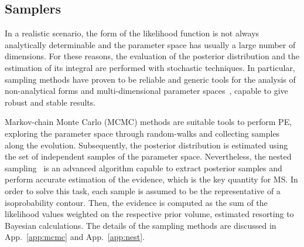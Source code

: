 \documentclass[prd,aps,twocolumn,a4paper,showkeys,nofootinbib,floatfix]{revtex4-1}
\newcommand{\be}{\begin{equation}}
\newcommand{\ee}{\end{equation}}
\def\params{\boldsymbol{\theta}}
\def\paramspace{\boldsymbol{\Theta}}
\def\data{\textbf{d}}
\begin{document}

\subsection{Samplers} 
\label{sec:sampler}
 
 In a realistic scenario, the form of the likelihood function is not always analytically determinable and
 the parameter space has usually a large number of dimensions. For these reasons,
 the evaluation of the posterior distribution and the estimation of its integral 
 are performed with stochastic techniques. In particular,
 sampling methods have proven to be reliable and generic tools
for the analysis of non-analytical forms and multi-dimensional parameter
spaces~\cite{Allison_2013,Veitch:2014wba,Tichy_2015,Handley_2015}, capable to give robust and stable results.
 
Markov-chain Monte Carlo (MCMC) methods are suitable tools to perform PE,
exploring the parameter space through random-walks 
and collecting samples along the evolution.
Subsequently, the posterior distribution is estimated 
using the set of independent samples of the parameter space.
Nevertheless,
the nested sampling~\cite{Skilling:2006} is an advanced algorithm capable to 
extract posterior samples and perform accurate estimation of the evidence,
which is the key quantity for MS. In order to solve this task,
each sample is assumed to be the representative of a isoprobability contour.
Then, the evidence is computed as the sum of the likelihood values 
weighted on the respective prior volume, 
estimated resorting to Bayesian calculations.
The details of the sampling methods are discussed
in App.~\ref{app:mcmc} and App.~\ref{app:nest}.
\end{document}
